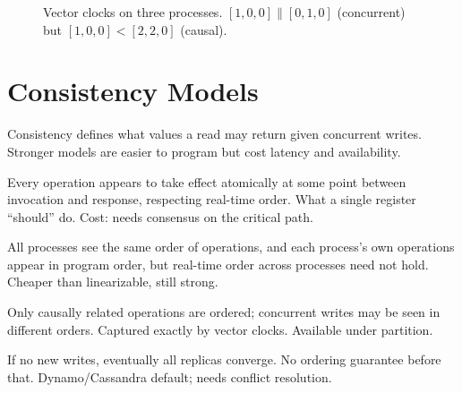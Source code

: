 \begin{figure}[h]
\centering
{}
\caption{Vector clocks on three processes. $[1,0,0]\parallel[0,1,0]$ (concurrent) but $[1,0,0]<[2,2,0]$ (causal).}
\label{fig:vector}
\end{figure}

\section{Consistency Models}
\label{sec:consistency}
Consistency defines what values a read may return given concurrent writes. Stronger models are easier to program but cost latency and availability.

\begin{description}[leftmargin=1.2em,style=nextline]
    \item[Linearizability (strong)] Every operation appears to take effect atomically at some point between invocation and response, respecting real-time order. What a single register ``should'' do. Cost: needs consensus on the critical path.
    \item[Sequential consistency] All processes see the same order of operations, and each process's own operations appear in program order, but real-time order across processes need not hold. Cheaper than linearizable, still strong.
    \item[Causal consistency] Only causally related operations are ordered; concurrent writes may be seen in different orders. Captured exactly by vector clocks. Available under partition.
    \item[Eventual consistency] If no new writes, eventually all replicas converge. No ordering guarantee before that. Dynamo/Cassandra default; needs conflict resolution.
\end{description}

